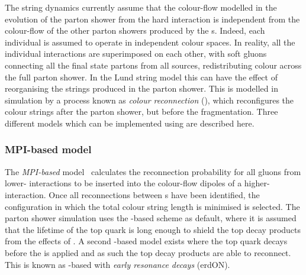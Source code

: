 The string dynamics currently assume that the colour-flow modelled in the evolution of the parton shower from the hard interaction is independent from the colour-flow of the other parton showers produced by the \MPI{}s.
Indeed, each individual \MPI{} is assumed to operate in independent colour spaces.
In reality, all the individual interactions are superimposed on each other, with soft gluons connecting all the final state partons from all sources, redistributing colour across the full parton shower.
In the Lund string model this can have the effect of reorganising the strings produced in the parton shower.
This is modelled in simulation by a process known as \textit{colour reconnection} (\CR{}), which reconfigures the colour strings after the parton shower, but before the fragmentation.
Three different models which can be implemented using \pythia{} are described here.

\subsubsection{MPI-based model} %
\label{sub:mpi_based_model}

The \textit{MPI-based} \CR{} model~\cite{Gen:GluonMove} calculates the reconnection probability for all gluons from lower-\pt{} interactions to be inserted into the colour-flow dipoles of a higher-\pt{} interaction.
Once all reconnections between \MPI{}s have been identified, the configuration in which the total colour string length is minimised is selected.
The \pythia{} parton shower simulation uses the \MPI{}-based \CR{} scheme as default, where it is assumed that the lifetime of the top quark is long enough to shield the top decay products from the effects of \CR{}.
A second \MPI{}-based model exists where the top quark decays before the \CR{} is applied and as such the top decay products are able to reconnect.
This is known as \MPI{}-based \CR{} with \textit{early resonance decays} (erdON).



